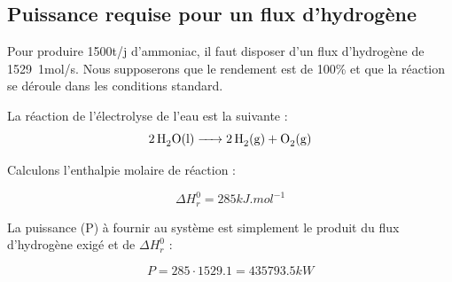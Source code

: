 \subsection{Puissance requise pour un flux d'hydrogène}

Pour produire \unit{1500}{t/j} d'ammoniac, il faut disposer d'un flux d'hydrogène de \unit{1529.1}{mol/s}. Nous supposerons que le rendement est de \unit{100}{\%} et que la réaction se déroule dans les conditions standard. 

La réaction de l’électrolyse de l'eau est la suivante : 
$$\ce {2H2O(l) -> 2H2(g) + O2(g)}$$ 

Calculons l'enthalpie molaire de réaction :

$$ \Delta H_r^0 =  \unit{285}{kJ.mol^{-1}} $$

La puissance (P) à fournir au système est simplement le produit du flux d'hydrogène exigé et de $ \Delta H_r^0$ :

$$ P = 285\cdot1529.1 = \unit{435 793.5}{kW} $$